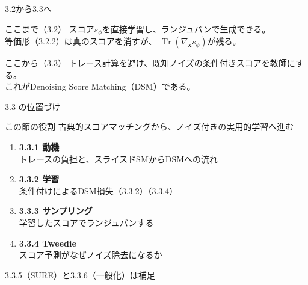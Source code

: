 ﻿%


\begin{frame}{3.2から3.3へ}
    \begin{block}{ここまで（3.2）}
        スコア$s_\phi$を直接学習し、ランジュバンで生成できる。\\
        等価形（3.2.2）は真のスコアを消すが、
        $\operatorname{Tr}(\nabla_{\bm{x}}s_\phi)$が残る。
    \end{block}
    \begin{block}{ここから（3.3）}
        トレース計算を避け、既知ノイズの条件付きスコアを教師にする。\\
        これがDenoising Score Matching（DSM）である。
    \end{block}
\end{frame}
\asmain
\begin{frame}{3.3 の位置づけ}
    \begin{block}{この節の役割}
        古典的スコアマッチングから、ノイズ付きの実用的学習へ進む
    \end{block}
    \begin{enumerate}
        \item \textbf{3.3.1 動機}\\
        トレースの負担と、スライスドSMからDSMへの流れ
        \item \textbf{3.3.2 学習}\\
        条件付けによるDSM損失（3.3.2）（3.3.4）
        \item \textbf{3.3.3 サンプリング}\\
        学習したスコアでランジュバンする
        \item \textbf{3.3.4 Tweedie}\\
        スコア予測がなぜノイズ除去になるか
    \end{enumerate}
    \vfill
    \footnotesize
    3.3.5（SURE）と3.3.6（一般化）は補足
\end{frame}
